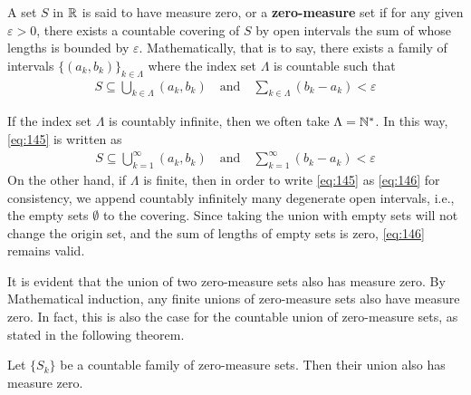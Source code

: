 \documentclass[thmcnt=section, 12pt]{my-elegantbook}
\begin{document}

\begin{definition} \label{def:6}
    A set $S$ in $\mathbb{R}$ is said to have measure zero,
    or a \textbf{zero-measure} set
    if for any given $\varepsilon > 0$,
    there exists a countable covering of $S$
    by open intervals the sum of whose lengths
    is bounded by $\varepsilon$.
    Mathematically, that is to say, there exists
    a family of intervals $\{(a_k, b_k)\}_{k \in \Lambda}$
    where the index set $\Lambda$ is countable such that
    \begin{align}
        S \subseteq \bigcup_{k \in \Lambda} (a_k, b_k)
        \quad \text{and} \quad
        \sum_{k \in \Lambda} (b_k - a_k) < \varepsilon
        \label{eq:145}
    \end{align}
\end{definition}

If the index set $\Lambda$ is countably infinite,
then we often take $\Lambda = \mathbb{N}^\ast$.
In this way, \eqref{eq:145} is written as
\begin{align}
    S \subseteq \bigcup_{k=1}^\infty (a_k, b_k)
    \quad \text{and} \quad
    \sum_{k=1}^\infty (b_k - a_k) < \varepsilon
    \label{eq:146}
\end{align}
On the other hand,
if $\Lambda$ is finite,
then in order to write \eqref{eq:145}
as \eqref{eq:146} for consistency,
we append countably infinitely many degenerate open intervals,
i.e., the empty sets $\emptyset$ to the covering.
Since taking the union with empty sets will not change the origin set,
and the sum of lengths of empty sets is zero,
\eqref{eq:146} remains valid.


It is evident that the union of two zero-measure sets also has measure zero.
By Mathematical induction,
any finite unions of zero-measure sets also have measure zero.
In fact, this is also the case for the countable union of zero-measure sets,
as stated in the following theorem.

\begin{theorem} \label{thm:86}
    Let $\{S_k\}$ be a countable family of zero-measure sets.
    Then their union also has measure zero.
\end{theorem}
\end{document}
